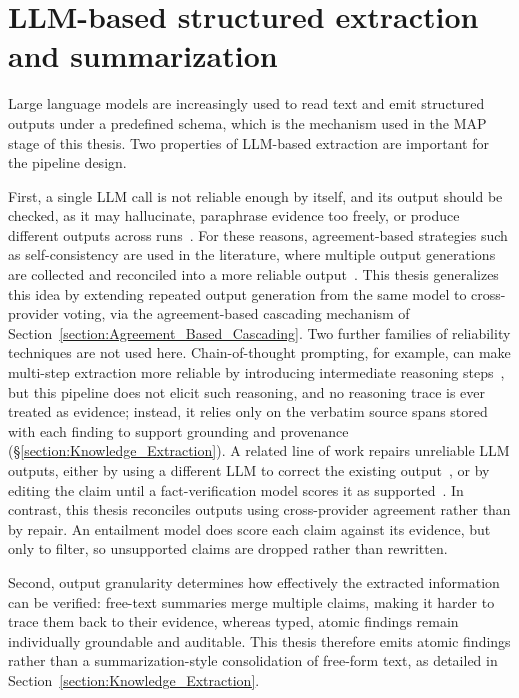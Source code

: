 \section{LLM-based structured extraction and summarization}\label{section:background-llm-based-structured-extraction-and-summarization}

Large language models are increasingly used to read text and emit structured outputs under a predefined schema, which is the mechanism used in the MAP stage of this thesis. Two properties of LLM-based extraction are important for the pipeline design.

First, a single LLM call is not reliable enough by itself, and its output should be checked, as it may hallucinate, paraphrase evidence too freely, or produce different outputs across runs~\parencite{huang2025surveyhallucinationlarge}. For these reasons, agreement-based strategies such as self-consistency are used in the literature, where multiple output generations are collected and reconciled into a more reliable output~\parencite{wang2022selfconsistency}. This thesis generalizes this idea by extending repeated output generation from the same model to cross-provider voting, via the agreement-based cascading mechanism of Section~\ref{section:Agreement_Based_Cascading}. Two further families of reliability techniques are not used here. Chain-of-thought prompting, for example, can make multi-step extraction more reliable by introducing intermediate reasoning steps~\parencite{wei2022chainofthoughtpromptingelicits}, but this pipeline does not elicit such reasoning, and no reasoning trace is ever treated as evidence; instead, it relies only on the verbatim source spans stored with each finding to support grounding and provenance (§\ref{section:Knowledge_Extraction}). A related line of work repairs unreliable LLM outputs, either by using a different LLM to correct the existing output~\parencite{zhong2024harnessinglargelanguage}, or by editing the claim until a fact-verification model scores it as supported~\parencite{chen2023convergetruthfactual}. In contrast, this thesis reconciles outputs using cross-provider agreement rather than by repair. An entailment model does score each claim against its evidence, but only to filter, so unsupported claims are dropped rather than rewritten.

Second, output granularity determines how effectively the extracted information can be verified: free-text summaries merge multiple claims, making it harder to trace them back to their evidence, whereas typed, atomic findings remain individually groundable and auditable. This thesis therefore emits atomic findings rather than a summarization-style consolidation of free-form text, as detailed in Section~\ref{section:Knowledge_Extraction}.